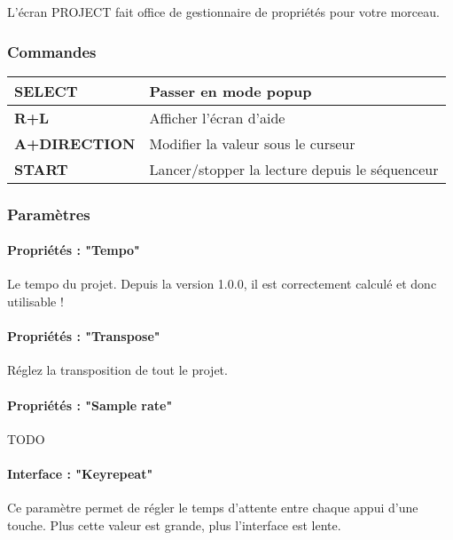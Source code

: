 L'écran PROJECT fait office de gestionnaire de propriétés pour votre morceau.


\subsubsection{Commandes}
\tablelasttail{\hline}
\begin{supertabular}{|l|p{11cm}|}
\hline
    {\bf SELECT} & Passer en mode popup \\
    \hline
    {\bf R+L} & Afficher l'écran d'aide \\
    \hline
    {\bf A+DIRECTION} & Modifier la valeur sous le curseur \\
    \hline
    {\bf START} & Lancer/stopper la lecture depuis le séquenceur \\
\hline
\end{supertabular}

\subsubsection{Paramètres}

\paragraph{Propriétés : "Tempo"} Le tempo du projet.
        Depuis la version 1.0.0, il est correctement calculé et donc utilisable !

\paragraph{Propriétés : "Transpose"} Réglez la transposition de tout le projet.

\paragraph{Propriétés : "Sample rate"} TODO

\paragraph{Interface : "Keyrepeat"} Ce paramètre permet de régler le temps d'attente entre chaque appui d'une touche.
                                    Plus cette valeur est grande, plus l'interface est lente.

